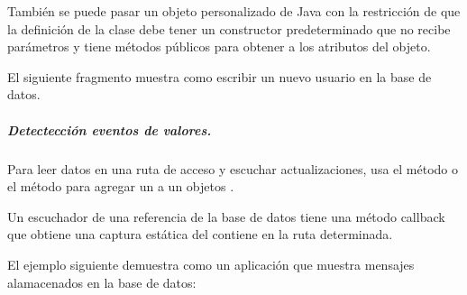 También se puede pasar un objeto personalizado de Java con la restricción
de que la definición de la clase debe tener un constructor predeterminado
que no recibe parámetros y tiene métodos públicos para obtener a los atributos
del objeto.

El siguiente fragmento muestra como escribir un nuevo usuario en la base de
datos.

%
\begin{sphinxVerbatim}[commandchars=\\\{\}]
      
    
\end{sphinxVerbatim}


\subparagraph{Detectección eventos de valores.}
\label{\detokenize{dev_docs:detecteccion-eventos-de-valores}}
Para leer datos en una ruta de acceso y escuchar actualizaciones, usa el
método  o el método 
para agregar un  a un objetos .

Un escuchador  de una referencia de la base de datos
tiene una método callback  que obtiene una captura estática
del contiene en la ruta determinada.

El ejemplo siguiente demuestra como un aplicación que muestra mensajes
alamacenados en la base de datos:

%
\begin{sphinxVerbatim}[commandchars=\\\{\}]
 
      
       
\end{sphinxVerbatim}

